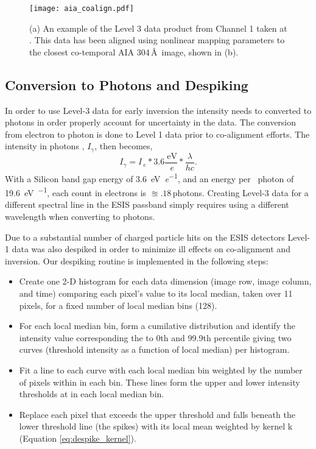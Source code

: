   		\begin{figure}[htb!]
    		\centering
    		\texttt{[image: aia\_coalign.pdf]}
    		\caption{(a) An example of the Level 3 data product from Channel 1 taken at \levthreetime. This data has been aligned using nonlinear mapping parameters to the closest co-temporal AIA 304\,\AA\ image, shown in (b). }
    		\label{fig:coalign}
    	\end{figure}
    	
    
    \subsection{Conversion to Photons and Despiking}
        In order to use Level-3 data for early inversion the intensity needs to  converted to photons in order properly account for uncertainty in the data.
        The conversion from electron to photon is done to Level 1 data prior to co-alignment efforts.
   		The intensity in photons , $I_{\gamma}$, then becomes,
   		\begin{equation}
	   		I_{\gamma} = I_{\SI{}{\elementarycharge}} * 3.6 \frac{\SI{}{\electronvolt}}{\SI{}{\elementarycharge}} * \frac{\lambda}{hc}.
   		\end{equation}
		With a Silicon band gap energy of \SI[per-mode=symbol]{3.6}{\electronvolt\per\elementarycharge}, and an energy per \ov \ photon 
		of \SI[per-mode=symbol]{19.6}{\electronvolt\per\photon}, each count in electrons is $\approxeq .18$\,photons.
		Creating Level-3 data for a different spectral line in the ESIS passband simply requires using a different wavelength when converting to photons.
		
		Due to a substantial number of charged particle hits on the ESIS detectors Level-1 data was also despiked in order to minimize ill effects on co-alignment and inversion.
		Our despiking routine is implemented in the following steps:
		\begin{itemize}
		    \item Create one 2-D histogram for each data dimension (image row, image column, and time) comparing each pixel's value to its local median, taken over 11 pixels, for a fixed number of local median bins (128).
		    \item For each local median bin, form a cumilative distribution and identify the intensity value corresponding the to 0th and 99.9th percentile giving two curves (threshold intensity as a function of local median) per histogram.
		    \item Fit a line to each curve with each local median bin weighted by the number of pixels within in each bin.  These lines form the upper and lower intensity thresholds at in each local median bin.
		    \item Replace each pixel that exceeds the upper threshold and falls beneath the lower threshold line (the spikes) with its local mean weighted by kernel k (Equation \ref{eq:despike_kernel}).
		\end{itemize}
	
